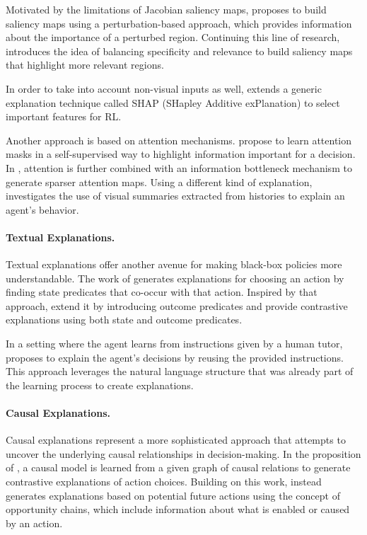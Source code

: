 Motivated by the limitations of Jacobian saliency maps, \cite{greydanus_visualizing_2018} proposes to build saliency maps using a perturbation-based approach, which provides information about the importance of a perturbed region. Continuing this line of research, \cite{gupta_explain_2020} introduces the idea of balancing specificity and relevance to build saliency maps that highlight more relevant regions.

In order to take into account non-visual inputs as well, \cite{wang_attribution-based_2020} extends a generic explanation technique called SHAP (SHapley Additive exPlanation) \citep{lundberg_unified_2017} to select important features for RL.

Another approach is based on attention mechanisms. \cite{shi_self-supervised_2020} propose to learn attention masks in a self-supervised way to highlight information important for a decision. In \cite{kim_attentional_2020}, attention is further combined with an information bottleneck mechanism to generate sparser attention maps. Using a different kind of explanation, \cite{sequeira_interestingness_2020} investigates the use of visual summaries extracted from histories to explain an agent's behavior.

\paragraph{Textual Explanations.}
Textual explanations offer another avenue for making black-box policies more understandable. The work of \cite{hayes_improving_2017} generates explanations for choosing an action by finding state predicates that co-occur with that action. Inspired by that approach, \cite{van_der_waa_contrastive_2018} extend it by introducing outcome predicates and provide contrastive explanations using both state and outcome predicates.

In a setting where the agent learns from instructions given by a human tutor, \cite{fukuchi_autonomous_2017} proposes to explain the agent's decisions by reusing the provided instructions. This approach leverages the natural language structure that was already part of the learning process to create explanations.

\paragraph{Causal Explanations.}
Causal explanations represent a more sophisticated approach that attempts to uncover the underlying causal relationships in decision-making. In the proposition of \cite{madumal_explainable_2020}, a causal model is learned from a given graph of causal relations to generate contrastive explanations of action choices. Building on this work, \cite{madumal_distal_2020} instead generates explanations based on potential future actions using the concept of opportunity chains, which include information about what is enabled or caused by an action.

